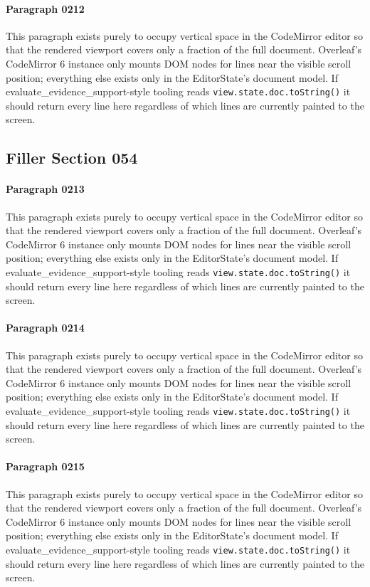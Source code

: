 \documentclass{article}
\begin{document}
\paragraph{Paragraph 0212}
This paragraph exists purely to occupy vertical space in the CodeMirror editor so that the rendered viewport covers only a fraction of the full document. Overleaf's CodeMirror 6 instance only mounts DOM nodes for lines near the visible scroll position; everything else exists only in the EditorState's document model. If evaluate\_evidence\_support-style tooling reads \texttt{view.state.doc.toString()} it should return every line here regardless of which lines are currently painted to the screen.

\subsection{Filler Section 054}
\paragraph{Paragraph 0213}
This paragraph exists purely to occupy vertical space in the CodeMirror editor so that the rendered viewport covers only a fraction of the full document. Overleaf's CodeMirror 6 instance only mounts DOM nodes for lines near the visible scroll position; everything else exists only in the EditorState's document model. If evaluate\_evidence\_support-style tooling reads \texttt{view.state.doc.toString()} it should return every line here regardless of which lines are currently painted to the screen.

\paragraph{Paragraph 0214}
This paragraph exists purely to occupy vertical space in the CodeMirror editor so that the rendered viewport covers only a fraction of the full document. Overleaf's CodeMirror 6 instance only mounts DOM nodes for lines near the visible scroll position; everything else exists only in the EditorState's document model. If evaluate\_evidence\_support-style tooling reads \texttt{view.state.doc.toString()} it should return every line here regardless of which lines are currently painted to the screen.

\paragraph{Paragraph 0215}
This paragraph exists purely to occupy vertical space in the CodeMirror editor so that the rendered viewport covers only a fraction of the full document. Overleaf's CodeMirror 6 instance only mounts DOM nodes for lines near the visible scroll position; everything else exists only in the EditorState's document model. If evaluate\_evidence\_support-style tooling reads \texttt{view.state.doc.toString()} it should return every line here regardless of which lines are currently painted to the screen.
\end{document}

